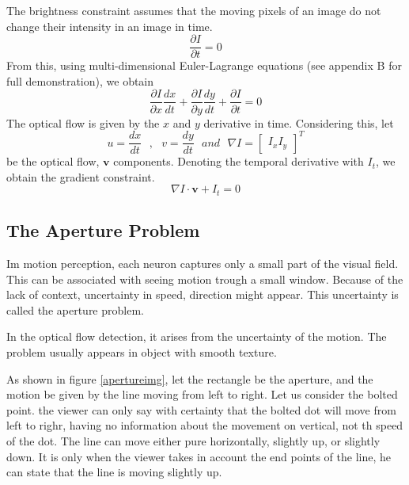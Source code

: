\documentclass[12pt,a4paper,twoside]{report}
\begin{document}
The brightness constraint assumes that the moving pixels of an image do not change their intensity in an image in time.
\begin{equation}  \label{Idt0}
\frac{\partial I}{\partial t} = 0
\end{equation}
From this, using multi-dimensional Euler-Lagrange equations (see appendix B for full demonstration), we obtain
\begin{equation} \label{Idt0_lagr}
\frac{\partial I}{\partial x}\frac{dx}{dt} +
\frac{\partial I}{\partial y}\frac{dy}{dt} +
\frac{\partial I}{\partial t} = 0
\end{equation}
The optical flow is given by the $x$ and $y$ derivative in time. Considering this, let
\begin{equation}
u = \frac{dx}{dt} \ \ \ , \ \ \  v = \frac{dy}{dt} \ \ \ and \ \ \ \nabla I=\begin{bmatrix}
I_x I_y
\end{bmatrix} ^T
\end{equation} 
be the optical flow, $\boldsymbol{v}$ components. Denoting the temporal derivative with $I_t$, we obtain the gradient constraint. 
\begin{equation}
	\nabla I \cdot \boldsymbol{v}+I_t = 0
\end{equation}


\subsection{The Aperture Problem}
Im motion perception, each neuron captures only a small part of the visual field. This can be associated with seeing motion trough a small window. Because of the lack of context, uncertainty in speed, direction might appear. This uncertainty is called the aperture problem.
 

In the optical flow detection, it arises from the uncertainty of the motion. The problem usually appears in object with smooth texture.

As shown in figure \ref{apertureimg}, let the rectangle be the aperture, and the motion be given by the line moving from left to right. Let us consider the bolted point. the viewer can only say with certainty that the bolted dot will move from left to righr, having no information about the movement on vertical, not th speed of the dot. The line can move either pure horizontally, slightly up, or slightly down. It is only when the viewer takes in account the end points of the line, he can state that the line is moving slightly up.  
\end{document}
